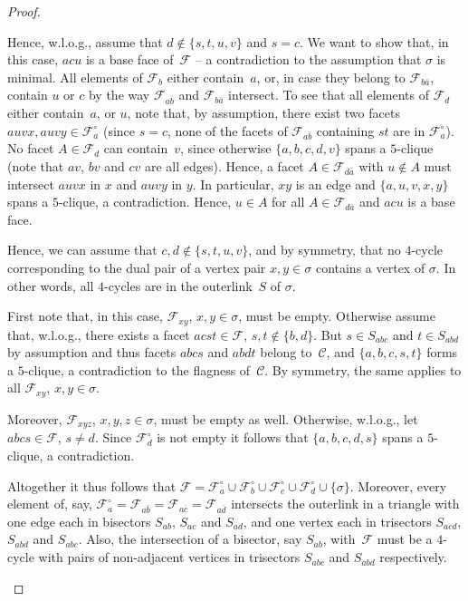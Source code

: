 \documentclass[a4paper,12pt]{amsart}
\theoremstyle{plain}
\theoremstyle{definition}
\newcommand{\C}{\mathcal C}
\newcommand{\family}{\mathcal F}
\newcommand{\facetA}{A}
\newcommand{\face}{\sigma}
\begin{document}
\begin{proof}
\begin{enumerate}
Hence, w.l.o.g., assume that $d \not \in \{s,t,u,v \}$ and $s=c$. We want to show that, in this case, $acu$ is a base face of~$\family$ -- a contradiction to the assumption that $\face$ is minimal. All elements of $\family_b$ either contain~$a$, or, in case they belong to $\family_{b \overline a}$, contain $u$ or $c$ by the way $\family_{a\overline b}$ and $\family_{b \overline a}$ intersect. To see that all elements of $\family_d$ either contain~$a$, or $u$, note that, by assumption, there exist two facets $auvx, auvy \in \family_a^{\circ}$ (since $s=c$, none of the facets of $\family_{a \overline b}$ containing $st$ are in $\family_a^{\circ}$). No facet $\facetA \in \family_d$ can contain~$v$, since otherwise $\{a,b,c,d,v\}$ spans a $5$-clique (note that $av$, $bv$ and $cv$ are all edges). Hence, a facet $\facetA \in \family_{d\overline a}$ with $u\not \in \facetA$ must intersect $auvx$ in $x$ and $auvy$ in $y$. In particular, $xy$ is an edge and $\{a,u,v,x,y\}$ spans a $5$-clique, a contradiction. Hence, $u \in A$ for all $A \in \family_{d\overline a}$ and $acu$ is a base face.

Hence, we can assume that $c,d \not \in \{s,t,u,v\}$, and by symmetry, that no $4$-cycle corresponding to the dual pair of a vertex pair $x,y \in \face$ contains a vertex of $\face$. In other words, all $4$-cycles are in the outerlink~$S$ of $\face$.

\medskip

First note that, in this case, $\family_{xy}$, $x,y \in \face$, must be empty. Otherwise assume that, w.l.o.g., there exists a facet $acst \in \family$, $s,t \not \in \{b,d\}$. But $s \in S_{abc}$ and $t \in S_{abd}$ by assumption and thus facets $abcs$ and $abdt$ belong to~$\C$, and $\{ a,b,c,s,t \}$ forms a $5$-clique, a contradiction to the flagness of~$\C$. By symmetry, the same applies to all $\family_{xy}$, $x,y \in \face$.

Moreover, $\family_{xyz}$, $x,y,z \in \face$, must be empty as well. Otherwise, w.l.o.g., let $abcs \in \family$, $s \neq d$. Since $\family_d^{\circ}$ is not empty it follows that $\{a,b,c,d,s\}$ spans a $5$-clique, a contradiction.

Altogether it thus follows that $\family = \family_a^{\circ} \cup \family_b^{\circ} \cup \family_c^{\circ} \cup \family_d^{\circ} \cup \{ \face \}$. Moreover, every element of, say, $\family_a^\circ = \family_{a\overline b}= \family_{a\overline c}= \family_{a\overline d}$ intersects the outerlink in a triangle with one edge each in bisectors $S_{ab}$, $S_{ac}$ and $S_{ad}$, and one vertex each in trisectors $S_{acd}$, $S_{abd}$ and $S_{abc}$. Also, the intersection of a bisector, say $S_{ab}$, with~$\family$ must be a $4$-cycle with pairs of non-adjacent vertices in trisectors $S_{abc}$ and $S_{abd}$ respectively.


\end{enumerate}
\end{proof}
\end{document}
